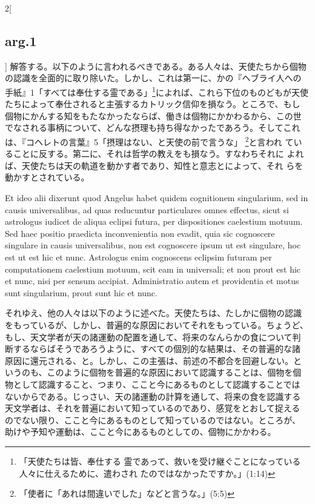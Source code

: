 \documentclass[paper=a4paper,fontsize=10pt,jafontsize=9pt,titlepage]{jlreq}
\begin{document}
\begin{paracol}{2}[\subsection{arg.1}]
解答する。以下のように言われるべきである。ある人々は、天使たちから個物
の認識を全面的に取り除いた。しかし、これは第一に、かの『ヘブライ人への
手紙』1「すべては奉仕する霊である」\footnote{「天使たちは皆、奉仕する
霊であって、救いを受け継ぐことになっている人々に仕えるために、遣わされ
たのではなかったですか。」(1:14)}によれば、これら下位のものどもが天使
たちによって奉仕されると主張するカトリック信仰を損なう。ところで、もし
個物にかんする知をもたなかったならば、働きは個物にかかわるから、この世
でなされる事柄について、どんな摂理も持ち得なかったであろう。そしてこれ
は、『コヘレトの言葉』5「摂理はない、と天使の前で言うな」
\footnote{「使者に「あれは間違いでした」などと言うな。」(5:5)}と言われ
ていることに反する。第二に、それは哲学の教えをも損なう。すなわちそれに
よれば、天使たちは天の軌道を動かす者であり、知性と意志とによって、それ
らを動かすとされている。

\switchcolumn*

Et ideo alii dixerunt quod Angelus habet quidem cognitionem
singularium, sed in causis universalibus, ad quas reducuntur
particulares omnes effectus, sicut si astrologus iudicet de aliqua
eclipsi futura, per dispositiones caelestium motuum. Sed haec positio
praedicta inconvenientia non evadit, quia sic cognoscere singulare in
causis universalibus, non est cognoscere ipsum ut est singulare, hoc
est ut est hic et nunc. Astrologus enim cognoscens eclipsim futuram
per computationem caelestium motuum, scit eam in universali; et non
prout est hic et nunc, nisi per sensum accipiat. Administratio autem
et providentia et motus sunt singularium, prout sunt hic et nunc.

\switchcolumn

それゆえ、他の人々は以下のように述べた。天使たちは、たしかに個物の認識
をもっているが、しかし、普遍的な原因においてそれをもっている。ちょうど、
もし、天文学者が天の諸運動の配置を通して、将来のなんらかの食について判
断するならばそうであろうように、すべての個別的な結果は、その普遍的な諸
原因に還元される、と。しかし、この主張は、前述の不都合を回避しない。と
いうのも、このように個物を普遍的な原因において認識することは、個物を個
物として認識すること、つまり、ここと今にあるものとして認識することでは
ないからである。じっさい、天の諸運動の計算を通して、将来の食を認識する
天文学者は、それを普遍において知っているのであり、感覚をとおして捉える
のでない限り、ここと今にあるものとして知っているのではない。ところが、
助けや予知や運動は、ここと今にあるものとしての、個物にかかわる。

\switchcolumn*


\end{paracol}
\end{document}
